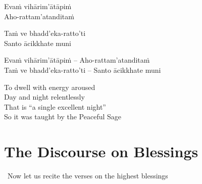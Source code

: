 \ifbfive\clearpage\fi

\ifninebythirteen

\begin{pali-hang-verses}
  Evaṁ vihārim'ātāpiṁ\\
  Aho-rattam'atanditaṁ
\end{pali-hang-verses}
\begin{pali-hang-together}
  Taṁ ve bhadd'eka-ratto'ti\\
  Santo ācikkhate muni
\end{pali-hang-together}

\else

\begin{verses}
  Evaṁ vihārim'ātāpiṁ – Aho-rattam'atanditaṁ\\
  Taṁ ve bhadd'eka-ratto'ti – Santo ācikkhate muni
\end{verses}

\fi

\ifafive\clearpage\fi

\begin{english-verses}
  To dwell with energy aroused\\
  Day and night relentlessly\ifdigital\makeatletter\hyperlink{endnote44-appendix}\makeatother\fi\\
  That is ``a single excellent night''\ifdigital\makeatletter\hyperlink{endnote45-appendix}\makeatother\fi\\
  So it was taught by the Peaceful Sage
\end{english-verses}

\suttaRef{[MN 131]}

\ifdigital{}\fi



\section{The Discourse on Blessings}
\label{discourse-on-blessings}

\begin{leader-english}
  \anglebracketleft\ \hspace{-0.5mm}Now let us recite the verses on the highest blessings\makeatletter\hyperlink{endnote46-appendix}\makeatother \hspace{-0.5mm}\anglebracketright\
\end{leader-english}

